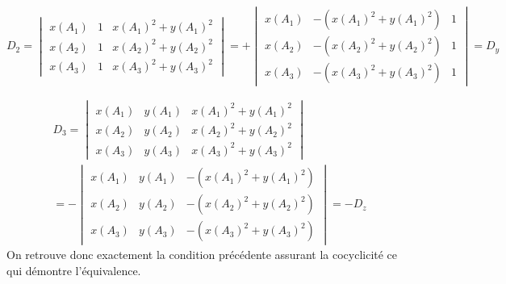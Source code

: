 \begin{displaymath}
 D_2 =
\begin{vmatrix}
 x(A_1) & 1 & x(A_1)^2+y(A_1)^2 \\ x(A_2) & 1 & x(A_2)^2+y(A_2)^2 \\ x(A_3) & 1 & x(A_3)^2+y(A_3)^2 
\end{vmatrix}
= +
\begin{vmatrix}
 x(A_1) & -(x(A_1)^2+y(A_1)^2) & 1 \\ x(A_2) & -(x(A_2)^2+y(A_2)^2) & 1 \\ x(A_3) & -(x(A_3)^2+y(A_3)^2)  & 1 
\end{vmatrix}
= D_y
\end{displaymath}


\begin{multline*}
 D_3 =
\begin{vmatrix}
 x(A_1) & y(A_1) & x(A_1)^2+y(A_1)^2 \\ x(A_2) & y(A_2) & x(A_2)^2+y(A_2)^2 \\ x(A_3) & y(A_3) & x(A_3)^2+y(A_3)^2 
\end{vmatrix} \\
= -
\begin{vmatrix}
 x(A_1) & y(A_1) & -(x(A_1)^2+y(A_1)^2) \\ x(A_2) & y(A_2) & -(x(A_2)^2+y(A_2)^2) \\ x(A_3) & y(A_3) & -(x(A_3)^2+y(A_3)^2) 
\end{vmatrix}
= -D_z
\end{multline*}
On retrouve donc exactement la condition précédente assurant la cocyclicité ce qui démontre l'équivalence.
